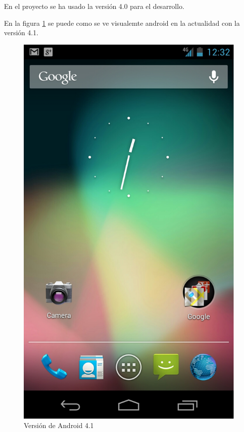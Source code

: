 En el proyecto se ha usado la versión 4.0 para el desarrollo.

En la figura \ref{fig:android41} se puede como se ve visualemte android en la actualidad con la versión 4.1.

\begin{figure}
  \centering
    \includegraphics[scale=0.3]{./ConocimientosPrevios/imagenes/android41.jpeg}
  \caption{Versión de Android 4.1}
  \label{fig:android41}
\end{figure}


